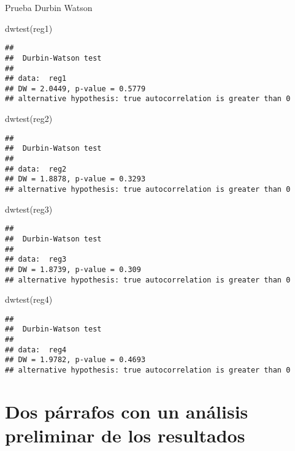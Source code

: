 \documentclass[
]{article}
\newenvironment{Shaded}{\begin{snugshade}}{\end{snugshade}}
\newcommand{\FunctionTok}[1]{\textcolor[rgb]{0.00,0.00,0.00}{#1}}
\newcommand{\NormalTok}[1]{#1}
\begin{document}
Prueba Durbin Watson

\begin{Shaded}
\begin{Highlighting}[]
\FunctionTok{dwtest}\NormalTok{(reg1)}
\end{Highlighting}
\end{Shaded}

\begin{verbatim}
## 
##  Durbin-Watson test
## 
## data:  reg1
## DW = 2.0449, p-value = 0.5779
## alternative hypothesis: true autocorrelation is greater than 0
\end{verbatim}

\begin{Shaded}
\begin{Highlighting}[]
\FunctionTok{dwtest}\NormalTok{(reg2)}
\end{Highlighting}
\end{Shaded}

\begin{verbatim}
## 
##  Durbin-Watson test
## 
## data:  reg2
## DW = 1.8878, p-value = 0.3293
## alternative hypothesis: true autocorrelation is greater than 0
\end{verbatim}

\begin{Shaded}
\begin{Highlighting}[]
\FunctionTok{dwtest}\NormalTok{(reg3)}
\end{Highlighting}
\end{Shaded}

\begin{verbatim}
## 
##  Durbin-Watson test
## 
## data:  reg3
## DW = 1.8739, p-value = 0.309
## alternative hypothesis: true autocorrelation is greater than 0
\end{verbatim}

\begin{Shaded}
\begin{Highlighting}[]
\FunctionTok{dwtest}\NormalTok{(reg4)}
\end{Highlighting}
\end{Shaded}

\begin{verbatim}
## 
##  Durbin-Watson test
## 
## data:  reg4
## DW = 1.9782, p-value = 0.4693
## alternative hypothesis: true autocorrelation is greater than 0
\end{verbatim}

\hypertarget{dos-puxe1rrafos-con-un-anuxe1lisis-preliminar-de-los-resultados}{%
\section{Dos párrafos con un análisis preliminar de los
resultados}\label{dos-puxe1rrafos-con-un-anuxe1lisis-preliminar-de-los-resultados}}
\end{document}
